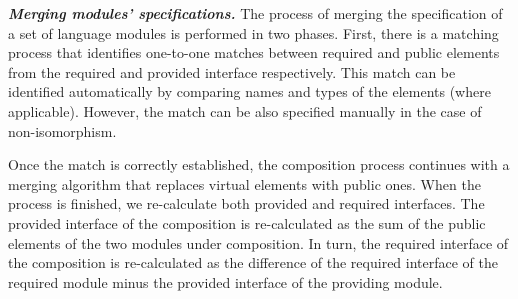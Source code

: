 
\vspace{2mm}
\textit{\textbf{Merging modules' specifications.}} The process of merging the specification of a set of language modules is performed in two phases. First, there is a matching process that identifies one-to-one matches between required and public elements from the required and provided interface respectively. This match can be identified automatically by comparing names and types of the elements (where applicable). However, the match can be also specified manually in the case of non-isomorphism.

Once the match is correctly established, the composition process continues with a merging algorithm that replaces virtual elements with public ones. When the process is finished, we re-calculate both provided and required interfaces. The provided interface of the composition is re-calculated as the sum of the public elements of the two modules under composition. In turn, the required interface of the composition is re-calculated as the difference of the required interface of the required module minus the provided interface of the providing module. 

